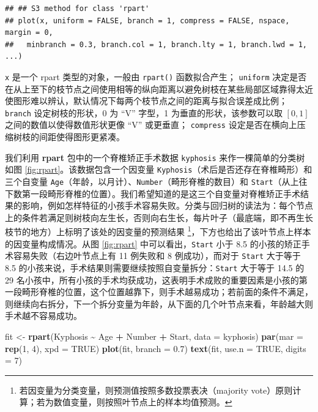 \documentclass[
  b5paper,
  UTF8,twoside]{book}
\newenvironment{Shaded}{\begin{snugshade}}{\end{snugshade}}
\newcommand{\AttributeTok}[1]{\textcolor[rgb]{0.13,0.29,0.53}{#1}}
\newcommand{\ConstantTok}[1]{\textcolor[rgb]{0.56,0.35,0.01}{#1}}
\newcommand{\DecValTok}[1]{\textcolor[rgb]{0.00,0.00,0.81}{#1}}
\newcommand{\FloatTok}[1]{\textcolor[rgb]{0.00,0.00,0.81}{#1}}
\newcommand{\FunctionTok}[1]{\textcolor[rgb]{0.13,0.29,0.53}{\textbf{#1}}}
\newcommand{\NormalTok}[1]{#1}
\newcommand{\OtherTok}[1]{\textcolor[rgb]{0.56,0.35,0.01}{#1}}
\newcommand{\SpecialCharTok}[1]{\textcolor[rgb]{0.81,0.36,0.00}{\textbf{#1}}}
\begin{document}
\begin{verbatim}
## ## S3 method for class 'rpart'
## plot(x, uniform = FALSE, branch = 1, compress = FALSE, nspace, margin = 0,
##   minbranch = 0.3, branch.col = 1, branch.lty = 1, branch.lwd = 1, ...)
\end{verbatim}

\texttt{x} 是一个 rpart 类型的对象，一般由 \texttt{rpart()} 函数拟合产生； \texttt{uniform} 决定是否在从上至下的枝节点之间使用相等的纵向距离以避免树枝在某些局部区域靠得太近使图形难以辨认，默认情况下每两个枝节点之间的距离与拟合误差成比例； \texttt{branch} 设定树枝的形状，0 为 ``V'' 字型，1 为垂直的形状，该参数可以取 \([0,1]\) 之间的数值以使得数值形状更像 ``V'' 或更垂直； \texttt{compress} 设定是否在横向上压缩树枝的间距使得图形更紧凑。

我们利用 \textbf{rpart} 包中的一个脊椎矫正手术数据 \texttt{kyphosis} 来作一棵简单的分类树如图 \ref{fig:rpart}。该数据包含一个因变量 \texttt{Kyphosis}（术后是否还存在脊椎畸形）和三个自变量 \texttt{Age}（年龄，以月计）、\texttt{Number}（畸形脊椎的数目）和 \texttt{Start}（从上往下数第一段畸形脊椎的位置）。我们希望知道的是这三个自变量对脊椎矫正手术结果的影响，例如怎样特征的小孩手术容易失败。分类与回归树的读法为：每个节点上的条件若满足则树枝向左生长，否则向右生长，每片叶子（最底端，即不再生长枝节的地方）上标明了该处的因变量的预测结果 \footnote{若因变量为分类变量，则预测值按照多数投票表决（majority vote）原则计算；若为数值变量，则按照叶节点上的样本均值预测。}，下方也给出了该叶节点上样本的因变量构成情况。从图 \ref{fig:rpart} 中可以看出，\texttt{Start} 小于 8.5 的小孩的矫正手术容易失败（右边叶节点上有 11 例失败和 8 例成功），而对于 \texttt{Start} 大于等于 8.5 的小孩来说，手术结果则需要继续按照自变量拆分：\texttt{Start} 大于等于 14.5 的 29 名小孩中，所有小孩的手术均获成功，这表明手术成败的重要因素是小孩的第一段畸形脊椎的位置，这个位置越靠下，则手术越易成功；若前面的条件不满足，则继续向右拆分，下一个拆分变量为年龄，从下面的几个叶节点来看，年龄越大则手术越不容易成功。





\begin{Shaded}
\begin{Highlighting}[]
\NormalTok{fit }\OtherTok{\textless{}{-}} \FunctionTok{rpart}\NormalTok{(Kyphosis }\SpecialCharTok{\textasciitilde{}}\NormalTok{ Age }\SpecialCharTok{+}\NormalTok{ Number }\SpecialCharTok{+}\NormalTok{ Start, }\AttributeTok{data =}\NormalTok{ kyphosis)}
\FunctionTok{par}\NormalTok{(}\AttributeTok{mar =} \FunctionTok{rep}\NormalTok{(}\DecValTok{1}\NormalTok{, }\DecValTok{4}\NormalTok{), }\AttributeTok{xpd =} \ConstantTok{TRUE}\NormalTok{)}
\FunctionTok{plot}\NormalTok{(fit, }\AttributeTok{branch =} \FloatTok{0.7}\NormalTok{)}
\FunctionTok{text}\NormalTok{(fit, }\AttributeTok{use.n =} \ConstantTok{TRUE}\NormalTok{, }\AttributeTok{digits =} \DecValTok{7}\NormalTok{)}
\end{Highlighting}
\end{Shaded}
\end{document}

